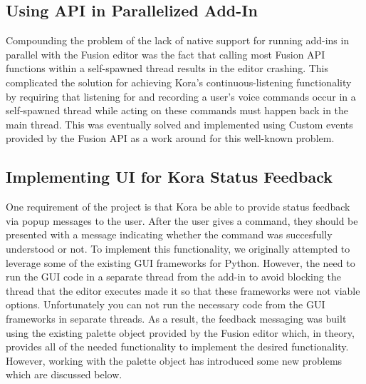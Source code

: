 \documentclass[onecolumn, draftclsnofoot,10pt, compsoc]{IEEEtran}
\begin{document}
	\subsection{Using API in Parallelized Add-In}
		Compounding the problem of the lack of native support for running add-ins in parallel with the Fusion editor was the fact that calling most Fusion API functions within a self-spawned thread results in the editor crashing.
		This complicated the solution for achieving Kora's continuous-listening functionality by requiring that listening for and recording a user's voice commands occur in a self-spawned thread while acting on these commands must happen back in the main thread.
		This was eventually solved and implemented using Custom events provided by the Fusion API as a work around for this well-known problem.

	\subsection{Implementing UI for Kora Status Feedback}
		One requirement of the project is that Kora be able to provide status feedback via popup messages to the user.
		After the user gives a command, they should be presented with a message indicating whether the command was succesfully understood or not.
		To implement this functionality, we originally attempted to leverage some of the existing GUI frameworks for Python. 
		However, the need to run the GUI code in a separate thread from the add-in to avoid blocking the thread that the editor executes made it so that these frameworks were not viable options.
		Unfortunately you can not run the necessary code from the GUI frameworks in separate threads. 
		As a result, the feedback messaging was built using the existing palette object provided by the Fusion editor which, in theory, provides all of the needed functionality to implement the desired functionality.
		However, working with the palette object has introduced some new problems which are discussed below.
\end{document}
